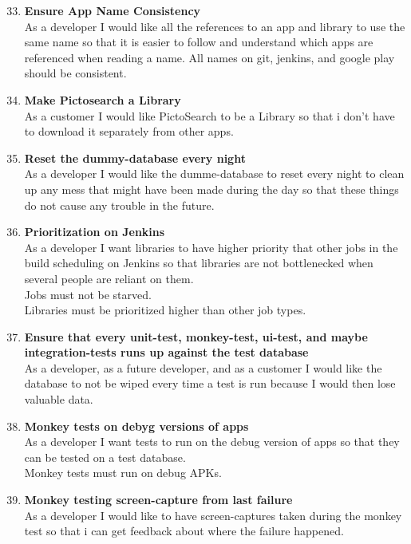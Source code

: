\begin{enumerate}
	\setcounter{enumi}{32} %
	\item \textbf{Ensure App Name Consistency}\\
	As a developer I would like all the references to an app and library to use the same name so that it is easier to follow and understand which apps are referenced when reading a name. All names on git, jenkins, and google play should be consistent.
	
	\item \textbf{Make Pictosearch a Library}\\
	As a customer I would like PictoSearch to be a Library so that i don’t have to download it separately from other apps.
	
	\item \textbf{Reset the dummy-database every night}\\
	As a developer I would like the dumme-database to reset every night to clean up any mess that might have been made during the day so that these things do not cause any trouble in the future.
	
	\item \textbf{Prioritization on Jenkins}\\
	As a developer I want libraries to have higher priority that other jobs in the build scheduling on Jenkins so that libraries are not bottlenecked when several people are reliant on them.\\
	Jobs must not be starved.\\
	Libraries must be prioritized higher than other job types.
	
	\item \textbf{Ensure that every unit-test, monkey-test, ui-test, and maybe integration-tests runs up against the test database}\\
	As a developer, as a future developer, and as a customer I would like the database to not be wiped every time a test is run because I would then lose valuable data.\\
	
	\item \textbf{Monkey tests on debyg versions of apps}\\
	As a developer I want tests to run on the debug version of apps so that they can be tested on a test database.\\
	Monkey tests must run on debug APKs.
	
	\item \textbf{Monkey testing screen-capture from last failure}\\
	As a developer I would like to have screen-captures taken during the monkey test so that i can get feedback about where the failure happened.
	

\end{enumerate}
